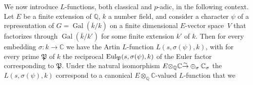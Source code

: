 \documentclass{amsart}
\begin{document}
We now introduce {$L$-functions{\futurelet{}}}, both classical and {$p$-adic{\futurelet{}}}, in the following context.  Let $ E $ be a finite extension
of $ {\mathbb Q} $, $ k $ a number field, and consider a character $ \psi $ of a representation of $ G = {\operatorname{Gal}}({\overline{k}}/k) $ on a finite dimensional
$ E $-vector space~$ V $ that factorizes through $ {\operatorname{Gal}}({\overline{k}}/k') $ for some finite extension $ k' $
of $ k $.   Then for every embedding $ {\sigma} : k \to {\mathbb C} $ we have the Artin {$L$-function{\futurelet{}}} $ {L(s,{\sigma}(\psi),k)}$,
with for every prime $ {\mathfrak P} $  of $ k $ the reciprocal $ {\textup{Eul}}_{\mathfrak P}(s, {\sigma}(\psi) ,k) $ of the Euler factor
corresponding to $ {\mathfrak P} $.
Under the natural isomorphism $ E {\otimes}_{\mathbb Q} {\mathbb C} {\buildrel{\sim}\over{\rightarrow}} \oplus_{\sigma} {\mathbb C}_{\sigma}  $
the $ {L(s,{\sigma}(\psi),k)}$ correspond to a canonical $ E{\otimes}_{\mathbb Q} {\mathbb C} $-valued {$L$-function{\futurelet{}}} that we
\end{document}
